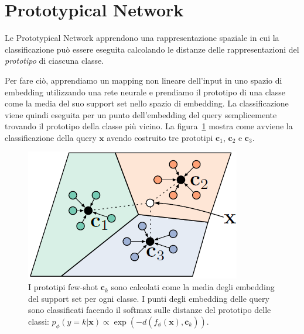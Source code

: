 \documentclass[12pt,a4paper,titlepage]{article}
\begin{document}

\section{Prototypical Network}
\label{sec:protonet}
Le Prototypical Network apprendono una rappresentazione spaziale in cui la classificazione può essere eseguita calcolando le distanze delle rappresentazioni del \textit{prototipo} di ciascuna classe. 

Per fare ciò, apprendiamo un mapping non lineare dell'input in uno spazio di embedding utilizzando una rete neurale e prendiamo il prototipo di una classe come la media del suo support set nello spazio di embedding. La classificazione viene quindi eseguita per un punto dell'embedding del query semplicemente trovando il prototipo della classe più vicino. La figura~\ref{fig:proto_few_zero_shot} mostra come avviene la classificazione della query $\mathbf{x}$ avendo costruito tre prototipi $\mathbf{c}_1$, $\mathbf{c}_2$ e $\mathbf{c}_3$.

\begin{figure}[h]
	\centering
	\includegraphics[width=.5\textwidth]{Immagini/proto_few_shot}
	\caption{I prototipi few-shot $\mathbf{c}_k$ sono calcolati come la media degli embedding del support set per ogni classe. I punti degli embedding delle query sono classificati facendo il softmax sulle distanze del prototipo delle classi: $p_\phi(y = k|\mathbf{x}) \propto \exp \left(-d(f_\phi(\mathbf{x}),\mathbf{c}_k) \right)$.~\cite{snell:prototypical}}
	\label{fig:proto_few_zero_shot}
\end{figure}
\end{document}
